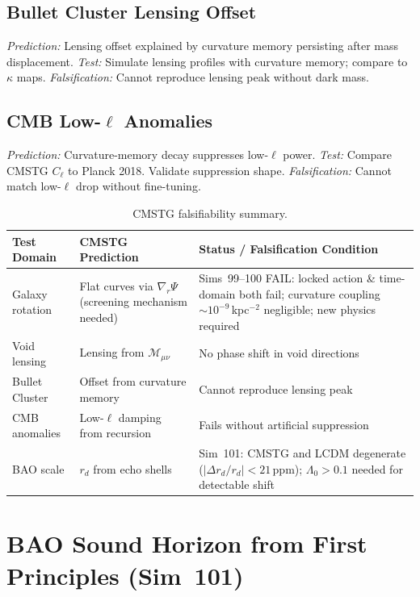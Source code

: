 \documentclass[12pt,a4paper]{article}
\begin{document}
\subsection{Bullet Cluster Lensing Offset}
\emph{Prediction:} Lensing offset explained by curvature memory persisting after
mass displacement.
\emph{Test:} Simulate lensing profiles with curvature memory; compare to $\kappa$ maps.
\emph{Falsification:} Cannot reproduce lensing peak without dark mass.

\subsection{CMB Low-\texorpdfstring{$\ell$}{ell} Anomalies}
\emph{Prediction:} Curvature-memory decay suppresses low-$\ell$ power.
\emph{Test:} Compare CMSTG $C_\ell$ to Planck 2018. Validate suppression shape.
\emph{Falsification:} Cannot match low-$\ell$ drop without fine-tuning.

\begin{table}[ht]
\centering
\caption{CMSTG falsifiability summary.}
\begin{tabular}{p{}p{}p{}}
\toprule
Test Domain & CMSTG Prediction & Status / Falsification Condition \\
\midrule
Galaxy rotation & Flat curves via $\nabla_r\Psi$ (screening mechanism needed) &
  Sims~99--100 FAIL: locked action \& time-domain both fail; curvature coupling
  $\sim10^{-9}$\,kpc$^{-2}$ negligible; new physics required \\[4pt]
Void lensing & Lensing from $\mathcal{M}_{\mu\nu}$ &
  No phase shift in void directions \\[4pt]
Bullet Cluster & Offset from curvature memory &
  Cannot reproduce lensing peak \\[4pt]
CMB anomalies & Low-$\ell$ damping from recursion &
  Fails without artificial suppression \\[4pt]
BAO scale & $r_d$ from echo shells &
  Sim~101: CMSTG and LCDM degenerate ($|\Delta r_d/r_d|<21$\,ppm);
  $\Lambda_0>0.1$ needed for detectable shift \\
\bottomrule
\end{tabular}
\end{table}

\section{BAO Sound Horizon from First Principles (Sim~101)}
\label{sec:sim101}
\end{document}

